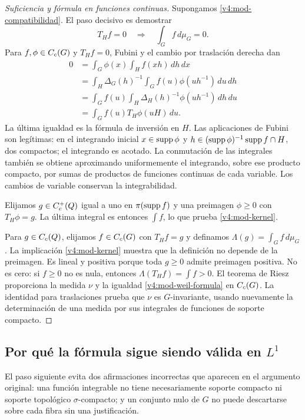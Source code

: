 \begin{proof}[Suficiencia y fórmula en funciones continuas]
Supongamos \eqref{v4:mod-compatibilidad}. El paso decisivo es demostrar
\begin{equation}\label{v4:mod-kernel}
 T_Hf=0\quad\Longrightarrow\quad\int_G f\,d\mu_G=0.
\end{equation}
Para $f,\phi\in C_c(G)$ y $T_Hf=0$, Fubini y el cambio por traslación derecha dan
\begin{align*}
 0&=\int_G\phi(x)\int_H f(xh)\,dh\,dx\\
  &=\int_H\Delta_G(h)^{-1}\int_G f(u)\phi(uh^{-1})\,du\,dh\\
  &=\int_G f(u)\int_H\Delta_H(h)^{-1}\phi(uh^{-1})\,dh\,du\\
  &=\int_G f(u)T_H\phi(uH)\,du.
\end{align*}
La última igualdad es la fórmula de inversión en $H$. Las aplicaciones de Fubini son legítimas: en el integrando inicial $x\in\operatorname{supp}\phi$ y $h\in(\operatorname{supp}\phi)^{-1}\operatorname{supp} f\cap H$, dos compactos; el integrando es acotado. La conmutación de las integrales también se obtiene aproximando uniformemente el integrando, sobre ese producto compacto, por sumas de productos de funciones continuas de cada variable. Los cambios de variable conservan la integrabilidad.

Elijamos $g\in C_c^+(Q)$ igual a uno en $\pi(\operatorname{supp} f)$ y una preimagen $\phi\geq0$ con $T_H\phi=g$. La última integral es entonces $\int f$, lo que prueba \eqref{v4:mod-kernel}.

Para $g\in C_c(Q)$, elijamos $f\in C_c(G)$ con $T_Hf=g$ y definamos
$\Lambda(g)=\int_G f\,d\mu_G$. La implicación \eqref{v4:mod-kernel} muestra que la definición no depende de la preimagen. Es lineal y positiva porque toda $g\geq0$ admite preimagen positiva. No es cero: si $f\geq0$ no es nula, entonces $\Lambda(T_Hf)=\int f>0$. El teorema de Riesz proporciona la medida $\nu$ y la igualdad \eqref{v4:mod-weil-formula} en $C_c(G)$. La identidad para traslaciones prueba que $\nu$ es $G$-invariante, usando nuevamente la determinación de una medida por sus integrales de funciones de soporte compacto.
\end{proof}

\subsection{Por qué la fórmula sigue siendo válida en \texorpdfstring{$L^1$}{L1}}
El paso siguiente evita dos afirmaciones incorrectas que aparecen en el argumento original: una función integrable no tiene necesariamente soporte compacto ni soporte topológico $\sigma$-compacto; y un conjunto nulo de $G$ no puede descartarse sobre cada fibra sin una justificación.

